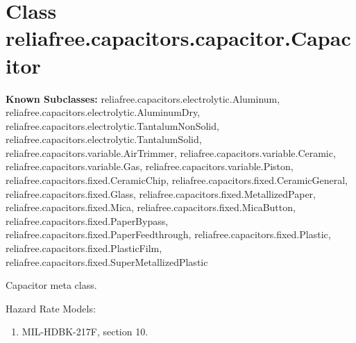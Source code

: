 %
%
%


\section{Class reliafree.capacitors.capacitor.Capacitor}

    \label{reliafree:capacitors:capacitor:Capacitor}
\textbf{Known Subclasses:}
reliafree.capacitors.electrolytic.Aluminum,
    reliafree.capacitors.electrolytic.AluminumDry,
    reliafree.capacitors.electrolytic.TantalumNonSolid,
    reliafree.capacitors.electrolytic.TantalumSolid,
    reliafree.capacitors.variable.AirTrimmer,
    reliafree.capacitors.variable.Ceramic,
    reliafree.capacitors.variable.Gas,
    reliafree.capacitors.variable.Piston,
    reliafree.capacitors.fixed.CeramicChip,
    reliafree.capacitors.fixed.CeramicGeneral,
    reliafree.capacitors.fixed.Glass,
    reliafree.capacitors.fixed.MetallizedPaper,
    reliafree.capacitors.fixed.Mica,
    reliafree.capacitors.fixed.MicaButton,
    reliafree.capacitors.fixed.PaperBypass,
    reliafree.capacitors.fixed.PaperFeedthrough,
    reliafree.capacitors.fixed.Plastic,
    reliafree.capacitors.fixed.PlasticFilm,
    reliafree.capacitors.fixed.SuperMetallizedPlastic

Capacitor meta class.

Hazard Rate Models:

\begin{enumerate}

\setlength{\parskip}{0.5ex}
  \item MIL-HDBK-217F, section 10.

\end{enumerate}



